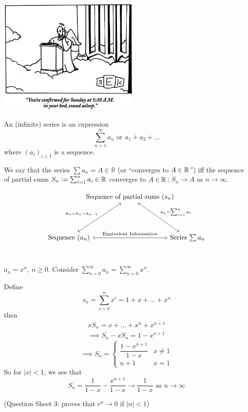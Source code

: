 \documentclass[10pt,twoside]{scrartcl}
\begin{document}
\vspace*{1cm}

\begin{center}
\includegraphics[width = 7cm]{cartoon1.jpg}	
\end{center}


\vspace*{5pt}

\begin{definition}
An (infinite) series is an expression \[\displaystyle{\sum_{n=1}^{\infty} a_n} \text{ or } a_1  + a_2 + \dots \] where $(a_i)_{i\geq 1}$ is a sequence.
\end{definition}


\begin{definition}
We say that the series $\sum a_n = A \in \mathbb{R}$ (or ``converges to $A \in \mathbb{R}$'') iff the sequence of partial sums $S_n:= \sum_{i=1}^n a_i \in \mathbb{R}$ converges to $A \in \mathbb{R}$; $S_n \to A$ as $n \to \infty$. 
\end{definition}


\[
\begin{tikzcd}[row sep=1.5cm,column sep = -.5cm]
 &  \mbox{Sequence of partial sums $(s_n)$}\arrow[<->]{dr}{s_n = \sum_{i=1}^n a_i} \\ 
\mbox{Sequence $(a_n)$} \arrow[<->]{ur}{a_n = s_n - s_{n-1}} \arrow[<->]{rr}{\text{Equivalent Information}} && \mbox{Series $\sum a_n$}
\end{tikzcd}
\]~\\



\begin{example}
$a_n = x^n,~n \geq 0$. Consider $\sum_{n=0}^{\infty} a_n = \sum_{n=0}^{\infty} x^n$.

Define \[s_n = \sum_{i=0}^n x^i = 1 + x + \dots + x^n\] then \begin{align*}xS_n = x + \dots + x^n + x^{n+1}\\ \implies S_n - xS_n = 1 - x^{n+1}\end{align*}
\[\implies S_n = \begin{cases}
 \dfrac{1-x^{n+1}}{1-x} & x \neq 1\\
 n+1 & x = 1	
 \end{cases}
\]
So for $|x| < 1$, we see that 
\[S_n = \frac{1}{1-x} - \frac{x^{n+1}}{1-x} \to \frac{1}{1-x} \text{ as } n \to \infty\]

(Question Sheet 3: proves that $r^n \to 0$ if $|n| < 1$)
\end{example}\vspace*{5pt}
\end{document}
